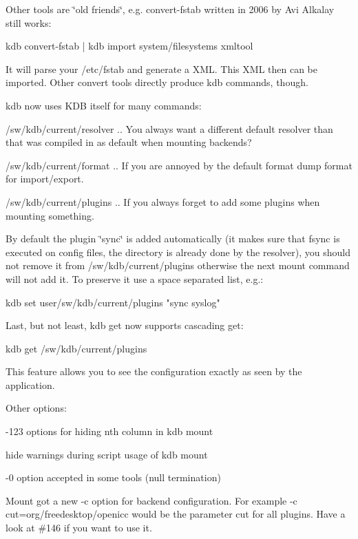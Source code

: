 Other tools are \char`\"{}old friends\char`\"{}, e.\+g. convert-\/fstab written in 2006 by Avi Alkalay still works\+: \begin{DoxyVerb}kdb convert-fstab | kdb import system/filesystems xmltool
\end{DoxyVerb}


It will parse your /etc/fstab and generate a X\+M\+L. This X\+M\+L then can be imported. Other convert tools directly produce kdb commands, though.

kdb now uses K\+D\+B itself for many commands\+:


\begin{DoxyItemize}
\item /sw/kdb/current/resolver .. You always want a different default resolver than that was compiled in as default when mounting backends?
\item /sw/kdb/current/format .. If you are annoyed by the default format dump format for import/export.
\item /sw/kdb/current/plugins .. If you always forget to add some plugins when mounting something.
\end{DoxyItemize}

By default the plugin \char`\"{}sync\char`\"{} is added automatically (it makes sure that fsync is executed on config files, the directory is already done by the resolver), you should not remove it from /sw/kdb/current/plugins otherwise the next mount command will not add it. To preserve it use a space separated list, e.\+g.\+: \begin{DoxyVerb}kdb set user/sw/kdb/current/plugins "sync syslog"
\end{DoxyVerb}


Last, but not least, kdb get now supports cascading get\+: \begin{DoxyVerb}kdb get /sw/kdb/current/plugins
\end{DoxyVerb}


This feature allows you to see the configuration exactly as seen by the application.

Other options\+:


\begin{DoxyItemize}
\item -\/123 options for hiding nth column in {\ttfamily kdb mount}
\item hide warnings during script usage of {\ttfamily kdb mount}
\item -\/0 option accepted in some tools (null termination)
\item Mount got a new -\/c option for backend configuration. For example -\/c cut=org/freedesktop/openicc would be the parameter cut for all plugins. Have a look at \#146 if you want to use it.
\end{DoxyItemize}

